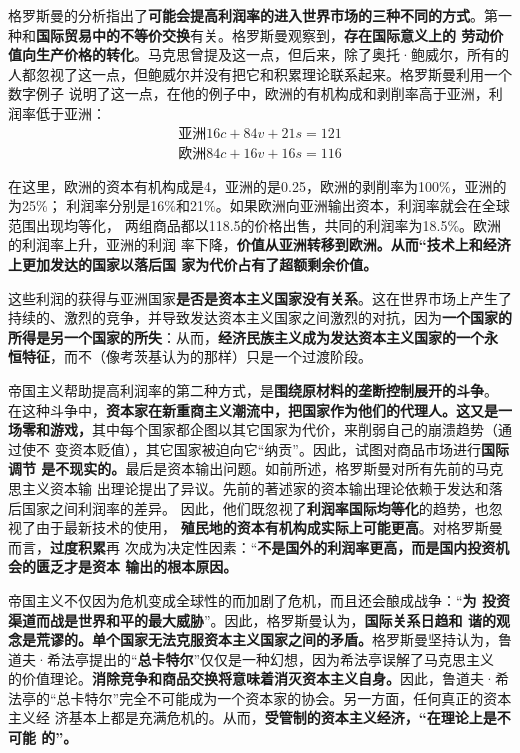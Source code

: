 格罗斯曼的分析指出了\textbf{可能会提高利润率的进入世界市场的三种不同的方式}。第一
种和\textbf{国际贸易中的不等价交换}有关。格罗斯曼观察到，\textbf{存在国际意义上的
  劳动价值向生产价格的转化}。马克思曾提及这一点，但后来，除了奥托·鲍威尔，所有的
人都忽视了这一点，但鲍威尔并没有把它和积累理论联系起来。格罗斯曼利用一个数字例子
说明了这一点，在他的例子中，欧洲的有机构成和剥削率高于亚洲，利润率低于亚洲：
\begin{gather*}
  \text{亚洲} 16c + 84v + 21s = 121 \\
  \text{欧洲} 84c + 16v + 16s = 116
\end{gather*}

在这里，欧洲的资本有机构成是4，亚洲的是0.25，欧洲的剥削率为100\%，亚洲的为25\%；
利润率分别是16\%和21\%。如果欧洲向亚洲输出资本，利润率就会在全球范围出现均等化，
两组商品都以118.5的价格出售，共同的利润率为18.5\%。欧洲的利润率上升，亚洲的利润
率下降，\textbf{价值从亚洲转移到欧洲。从而“技术上和经济上更加发达的国家以落后国
家为代价占有了超额剩余价值。}

这些利润的获得与亚洲国家\textbf{是否是资本主义国家没有关系}。这在世界市场上产生了
持续的、激烈的竞争，并导致发达资本主义国家之间激烈的对抗，因为\textbf{一个国家的
  所得是另一个国家的所失}：从而，\textbf{经济民族主义成为发达资本主义国家的一个永
  恒特征}，而不（像考茨基认为的那样）只是一个过渡阶段。

帝国主义帮助提高利润率的第二种方式，是\textbf{围绕原材料的垄断控制展开的斗争}。
在这种斗争中，\textbf{资本家在新重商主义潮流中，把国家作为他们的代理人。这又是一
场零和游戏，}其中每个国家都企图以其它国家为代价，来削弱自己的崩溃趋势（通过使不
变资本贬值），其它国家被迫向它“纳贡”。因此，试图对商品市场进行\textbf{国际调节
是不现实的。}最后是资本输出问题。如前所述，格罗斯曼对所有先前的马克思主义资本输
出理论提出了异议。先前的著述家的资本输出理论依赖于发达和落后国家之间利润率的差异。
因此，他们既忽视了\textbf{利润率国际均等化}的趋势，也忽视了由于最新技术的使用，
\textbf{殖民地的资本有机构成实际上可能更高}。对格罗斯曼而言，\textbf{过度积累}再
次成为决定性因素：“\textbf{不是国外的利润率更高，而是国内投资机会的匮乏才是资本
输出的根本原因。}

帝国主义不仅因为危机变成全球性的而加剧了危机，而且还会酿成战争：“\textbf{为
投资渠道而战是世界和平的最大威胁}”。因此，格罗斯曼认为，\textbf{国际关系日趋和
谐的观念是荒谬的。单个国家无法克服资本主义国家之间的矛盾。}格罗斯曼坚持认为，鲁
道夫·希法亭提出的“\textbf{总卡特尔}”仅仅是一种幻想，因为希法亭误解了马克思主义
的价值理论。\textbf{消除竞争和商品交换将意味着消灭资本主义自身。}因此，鲁道夫·希
法亭的“总卡特尔”完全不可能成为一个资本家的协会。另一方面，任何真正的资本主义经
济基本上都是充满危机的。从而，\textbf{受管制的资本主义经济，“在理论上是不可能
的”。}

